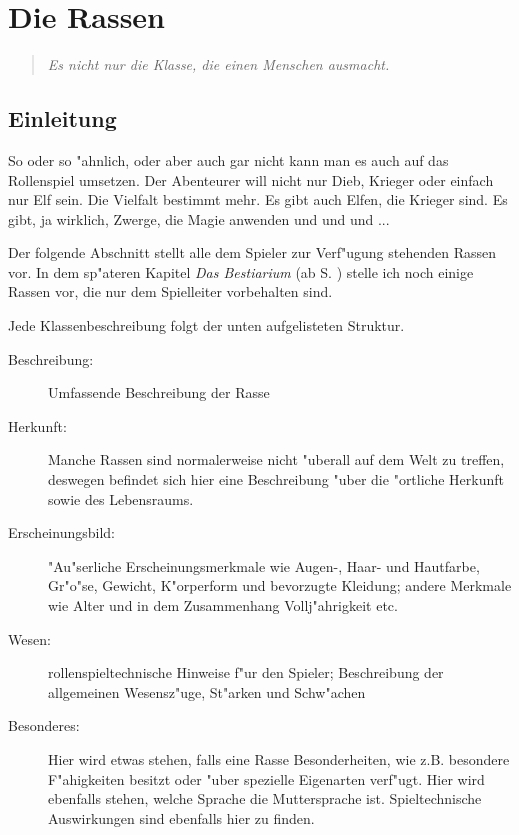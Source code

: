 \chapter{Die Rassen}
\label{dierassen}
\begin{quotation}
\par\textit{\glqq Es nicht nur die Klasse, die einen Menschen ausmacht.\grqq}
\end{quotation}
\section{Einleitung}
\par So oder so "ahnlich, oder aber auch gar nicht kann man es auch auf das Rollenspiel umsetzen. Der Abenteurer will nicht nur Dieb, Krieger oder einfach nur Elf sein. Die Vielfalt bestimmt mehr. Es gibt auch Elfen, die Krieger sind. Es gibt, ja wirklich, Zwerge, die Magie anwenden und und und ...
\par Der folgende Abschnitt stellt alle dem Spieler zur Verf"ugung stehenden Rassen vor. In dem sp"ateren Kapitel \textit{Das Bestiarium} (ab S. \pageref{bestiarium}) stelle ich noch einige Rassen vor, die nur dem Spielleiter vorbehalten sind.
\par Jede Klassenbeschreibung folgt der unten aufgelisteten Struktur.
\begin{description}
\item[Beschreibung:]Umfassende Beschreibung der Rasse
\item[Herkunft:]Manche Rassen sind normalerweise nicht "uberall auf dem Welt zu treffen, deswegen befindet sich hier eine Beschreibung "uber die "ortliche Herkunft sowie des Lebensraums.
\item[Erscheinungsbild:]"Au"serliche Erscheinungsmerkmale wie Augen-, Haar- und Hautfarbe, Gr"o"se, Gewicht, K"orperform und bevorzugte Kleidung; andere Merkmale wie Alter und in dem Zusammenhang Vollj"ahrigkeit etc.
\item[Wesen:]rollenspieltechnische Hinweise f"ur den Spieler; Beschreibung der allgemeinen Wesensz"uge, St"arken und Schw"achen
\item[Besonderes:]Hier wird etwas stehen, falls eine Rasse Besonderheiten, wie \mbox{z.B.} besondere F"ahigkeiten besitzt oder "uber spezielle Eigenarten verf"ugt. Hier wird ebenfalls stehen, welche Sprache die Muttersprache ist. Spieltechnische Auswirkungen sind ebenfalls hier zu finden.
\end{description}

